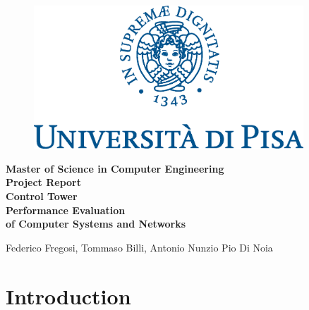 \documentclass[12pt]{article}
\begin{document}
\begin{titlepage}

\begin{figure}[t]
	\centering\includegraphics[width=0.9\textwidth]{immagini/marchio_unipi_pant541.eps}
\end{figure}

\begin{center}
	\textbf{Master of Science in Computer Engineering\\}
	\vspace{30mm}
    {\Huge{\bf {Project Report}}}\\
    \vspace{10mm}
    {\Huge{\bf {Control Tower}}}\\
	\vspace{10mm}
	{\LARGE{\bf Performance Evaluation\\[0.5em]of Computer Systems and Networks}}\\
    \vspace{20mm}
\end{center}

\vspace{8mm}

\begin{center}
	{\large Federico Fregosi, Tommaso Billi, Antonio Nunzio Pio Di Noia}
\end{center}

\vfill


\end{titlepage}


\tableofcontents
\vfill
\clearpage
\setcounter{page}{1}

\section{Introduction}
\end{document}
